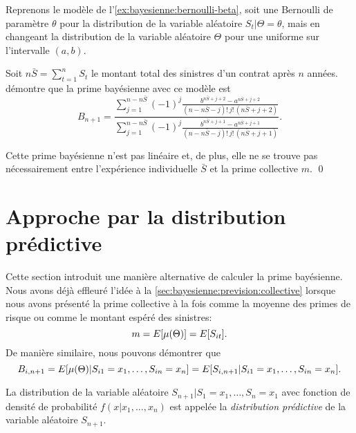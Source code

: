 \begin{exemple}
  \label{ex:bayesienne:bernoulli-uniforme}
  Reprenons le modèle de l'\autoref{ex:bayesienne:bernoulli-beta},
  soit une Bernoulli de paramètre $\theta$ pour la distribution de la
  variable aléatoire $S_t|\Theta = \theta$, mais en changeant la
  distribution de la variable aléatoire $\Theta$ pour une uniforme sur
  l'intervalle $(a, b)$.

  Soit $n \bar{S} = \sum_{t = 1}^n S_t$ le montant total des sinistres
  d'un contrat après $n$ années. \cite{Norberg:credibility:1979}
  démontre que la prime bayésienne avec ce modèle est
  \begin{equation*}
    B_{n + 1} =
    \dfrac{\sum_{j = 1}^{n - n \bar{S}} (-1)^j
      \frac{b^{n \bar{S} + j + 2} - a^{n \bar{S} + j + 2}}
      {(n - n \bar{S} - j)!\, j!\, (n \bar{S} + j + 2)}}
    {\sum_{j = 1}^{n - n \bar{S}} (-1)^j
      \frac{b^{n \bar{S} + j + 1} - a^{n \bar{S} + j + 1}}
      {(n - n \bar{S} - j)!\, j!\, (n \bar{S} + j + 1)}}.
  \end{equation*}

  Cette prime bayésienne n'est pas linéaire et, de plus, elle ne se
  trouve pas nécessairement entre l'expérience individuelle $\bar{S}$
  et la prime collective $m$. %
  \qed
\end{exemple}


\section{Approche par la distribution prédictive}
\label{sec:bayesienne:predictive}

Cette section introduit une manière alternative de calculer la prime
bayésienne. Nous avons déjà effleuré l'idée à la
\autoref{sec:bayesienne:prevision:collective} lorsque nous avons
présenté la prime collective à la fois comme la moyenne des primes de
risque ou comme le montant espéré des sinistres:
\begin{equation*}
  m = E [ \mu(\Theta) ] = E [ S_{it} ].
\end{equation*}
De manière similaire, nous pouvons démontrer que
\begin{equation}
  \label{eq:bayesienne:predictive}
  B_{i, n + 1} = E [ \mu(\Theta)|S_{i1} = x_1, \dots, S_{in} = x_n ]
  = E [ S_{i, n + 1}|S_{i1} = x_1, \dots, S_{in} = x_n ].
\end{equation}

La distribution de la variable aléatoire
$S_{n + 1}|S_1 = x_1, \dots, S_n = x_1$ avec fonction de densité de
probabilité $f(x|x_1, \dots, x_n)$ est appelée la \emph{distribution
  prédictive} de la variable aléatoire $S_{n + 1}$.

